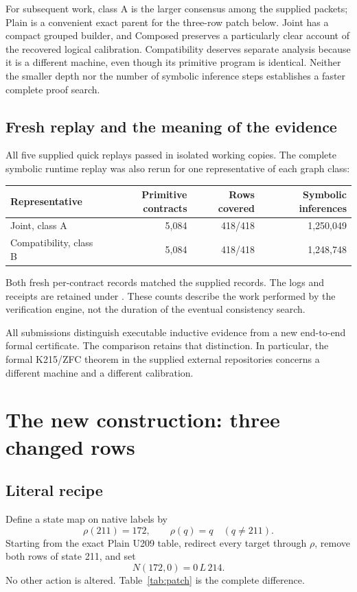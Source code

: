 \documentclass[11pt,letterpaper]{article}
\newcommand{\act}[3]{#1\,#2\,#3}
\begin{document}
For subsequent work, class A is the larger consensus among the supplied
packets; Plain is a convenient exact parent for the three-row patch below.
Joint has a compact grouped builder, and Composed preserves a particularly
clear account of the recovered logical calibration. Compatibility deserves
separate analysis because it is a different machine, even though its
primitive program is identical. Neither the smaller depth nor the number
of symbolic inference steps establishes a faster complete proof search.

\subsection{Fresh replay and the meaning of the evidence}
All five supplied quick replays passed in isolated working copies.
The complete symbolic runtime replay was also rerun for one representative
of each graph class:
\begin{center}
\begin{tabular}{@{}lrrr@{}}
\toprule
Representative & Primitive contracts & Rows covered & Symbolic inferences\\
\midrule
Joint, class A & 5,084 & 418/418 & 1,250,049\\
Compatibility, class B & 5,084 & 418/418 & 1,248,748\\
\bottomrule
\end{tabular}
\end{center}
Both fresh per-contract records matched the supplied records. The logs and
receipts are retained under . These counts describe the
work performed by the verification engine, not the duration of the
eventual consistency search.

All submissions distinguish executable inductive evidence from a new
end-to-end formal certificate. The comparison retains that distinction.
In particular, the formal K215/ZFC theorem in the supplied external
repositories concerns a different machine and a different calibration.

\section{The new construction: three changed rows}
\subsection{Literal recipe}
Define a state map on native labels by
\[
 \rho(211)=172,\qquad \rho(q)=q\quad(q\ne211).
\]
Starting from the exact Plain U209 table, redirect every target through
$\rho$, remove both rows of state 211, and set
\begin{equation}\label{eq:newrow}
                  N(172,0)=\act0L{214}.
\end{equation}
No other action is altered. Table~\ref{tab:patch} is the complete difference.
\end{document}
